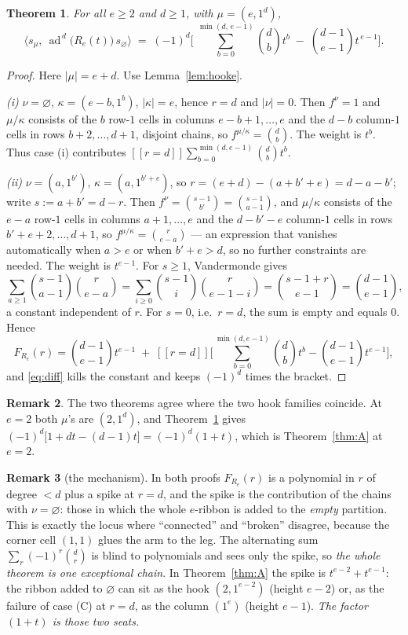 \documentclass[11pt]{article}
\theoremstyle{plain}
\newtheorem{theorem}{Theorem}
\theoremstyle{definition}
\newtheorem{remark}[theorem]{Remark}
\DeclareMathOperator{\ad}{ad}
\newcommand{\ind}[1]{[\![#1]\!]}
\begin{document}
\begin{theorem}\label{thm:B}
For all $e\ge2$ and $d\ge1$, with $\mu=(e,1^{d})$,
\[
  \bigl\langle s_{\mu},\ \ad^{\,d}\bigl(R_e(t)\bigr)\,s_\varnothing\bigr\rangle
  \;=\;(-1)^{d}\Biggl[\ \sum_{b=0}^{\min(d,\,e-1)}\binom{d}{b}t^{b}
     \;-\;\binom{d-1}{e-1}t^{\,e-1}\Biggr].
\]
\end{theorem}

\begin{proof}
Here $|\mu|=e+d$.  Use Lemma~\ref{lem:hooke}.

\emph{(i)} $\nu=\varnothing$, $\kappa=(e-b,1^{b})$, $|\kappa|=e$, hence $r=d$ and
$|\nu|=0$.  Then $f^{\nu}=1$ and $\mu/\kappa$ consists of the $b$ row-$1$ cells in
columns $e-b+1,\dots,e$ and the $d-b$ column-$1$ cells in rows $b+2,\dots,d+1$,
disjoint chains, so $f^{\mu/\kappa}=\binom{d}{b}$.  The weight is $t^{b}$.  Thus
case (i) contributes $\ind{r=d}\sum_{b=0}^{\min(d,e-1)}\binom{d}{b}t^{b}$.

\emph{(ii)} $\nu=(a,1^{b'})$, $\kappa=(a,1^{b'+e})$, so
$r=(e+d)-(a+b'+e)=d-a-b'$; write $s:=a+b'=d-r$.  Then
$f^{\nu}=\binom{s-1}{b'}=\binom{s-1}{a-1}$, and $\mu/\kappa$ consists of the
$e-a$ row-$1$ cells in columns $a+1,\dots,e$ and the $d-b'-e$ column-$1$ cells in
rows $b'+e+2,\dots,d+1$, so $f^{\mu/\kappa}=\binom{r}{e-a}$ --- an expression
that vanishes automatically when $a>e$ or when $b'+e>d$, so no further
constraints are needed.  The weight is $t^{e-1}$.  For $s\ge1$, Vandermonde gives
\[
  \sum_{a\ge1}\binom{s-1}{a-1}\binom{r}{e-a}
  =\sum_{i\ge0}\binom{s-1}{i}\binom{r}{e-1-i}
  =\binom{s-1+r}{e-1}=\binom{d-1}{e-1},
\]
a constant independent of $r$.  For $s=0$, i.e.\ $r=d$, the sum is empty and
equals $0$.  Hence
\[
  F_{R_e}(r)=\binom{d-1}{e-1}t^{e-1}
  \;+\;\ind{r=d}\Biggl[\sum_{b=0}^{\min(d,e-1)}\binom{d}{b}t^{b}
        -\binom{d-1}{e-1}t^{e-1}\Biggr],
\]
and \eqref{eq:diff} kills the constant and keeps $(-1)^d$ times the bracket.
\end{proof}

\begin{remark}
The two theorems agree where the two hook families coincide.  At $e=2$ both
$\mu$'s are $(2,1^{d})$, and Theorem~\ref{thm:B} gives
$(-1)^d\bigl[1+dt-(d-1)t\bigr]=(-1)^d(1+t)$, which is Theorem~\ref{thm:A} at
$e=2$.
\end{remark}

\begin{remark}[the mechanism]\label{rem:mech}
In both proofs $F_{R_e}(r)$ is a polynomial in $r$ of degree $<d$ plus a spike
at $r=d$, and the spike is the contribution of the chains with $\nu=\varnothing$:
those in which the whole $e$-ribbon is added to the \emph{empty} partition.
This is exactly the locus where ``connected'' and ``broken'' disagree, because
the corner cell $(1,1)$ glues the arm to the leg.  The alternating sum
$\sum_r(-1)^r\binom dr$ is blind to polynomials and sees only the spike, so
\emph{the whole theorem is one exceptional chain}.  In Theorem~\ref{thm:A} the
spike is $t^{e-2}+t^{e-1}$: the ribbon added to $\varnothing$ can sit as the hook
$(2,1^{e-2})$ (height $e-2$) or, as the failure of case (C) at $r=d$, as the
column $(1^{e})$ (height $e-1$).  \emph{The factor $(1+t)$ is those two seats.}
\end{remark}
\end{document}
